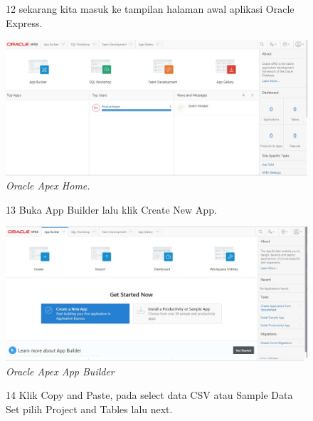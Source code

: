 \begin{enumerate}
\begin{figure}
\item[12] sekarang kita masuk ke tampilan halaman awal aplikasi Oracle Express.

    \begin{center}
\includegraphics[scale=0.4]{figures/pict(7).jpg}
    \caption{\textit{Oracle Apex Home.}}
        \end{center}
\label{gambar}
\end{figure}

\begin{figure}
\item[13] Buka App Builder lalu klik Create New App.

    \begin{center}
\includegraphics[scale=0.4]{figures/pict(8).jpg}
    \caption{\textit{Oracle Apex App Builder}}
        \end{center}
\label{gambar}
\end{figure}

\begin{figure}
\item[14] Klik Copy and Paste, pada select data CSV atau Sample Data Set pilih Project and Tables lalu next.


\end{figure}
\end{enumerate}
